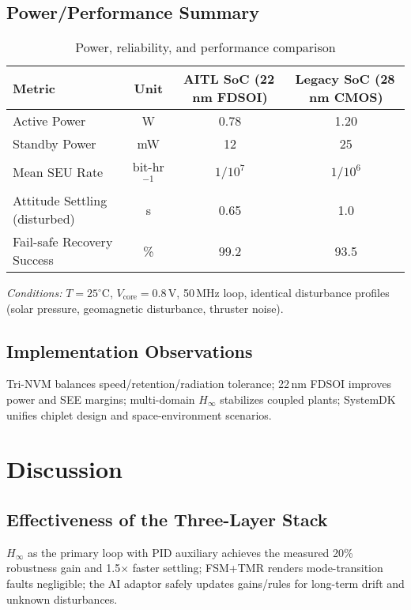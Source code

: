 \documentclass[conference]{IEEEtran}
\begin{document}
\subsection{Power/Performance Summary}
\begin{table*}[t]
\centering
\caption{Power, reliability, and performance comparison}
\label{tab:power}
\setlength{\tabcolsep}{10pt} %
\renewcommand{\arraystretch}{1.2} %
\begin{tabular}{lccc}
\toprule
Metric & Unit & AITL SoC (22\,nm FDSOI) & Legacy SoC (28\,nm CMOS)\\
\midrule
Active Power            & W     & 0.78  & 1.20  \\
Standby Power           & mW    & 12    & 25    \\
Mean SEU Rate           & bit-hr$^{-1}$ & $1/10^7$ & $1/10^6$ \\
Attitude Settling (disturbed) & s & 0.65  & 1.0   \\
Fail-safe Recovery Success    & \% & 99.2 & 93.5  \\
\bottomrule
\end{tabular}
\vspace{2pt}
\footnotesize \emph{Conditions:} $T=25^\circ$C, $V_{\mathrm{core}}=0.8$\,V, 50\,MHz loop, identical disturbance profiles (solar pressure, geomagnetic disturbance, thruster noise).
\end{table*}

\subsection{Implementation Observations}
Tri-NVM balances speed/retention/radiation tolerance; 22\,nm FDSOI improves power
and SEE margins; multi-domain $H_\infty$ stabilizes coupled plants; SystemDK unifies
chiplet design and space-environment scenarios.

\section{Discussion}
\subsection{Effectiveness of the Three-Layer Stack}
$H_\infty$ as the primary loop with PID auxiliary achieves the measured 20\% robustness
gain and 1.5$\times$ faster settling; FSM+TMR renders mode-transition faults negligible;
the AI adaptor safely updates gains/rules for long-term drift and unknown disturbances.
\end{document}
